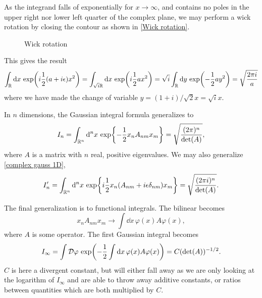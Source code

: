 As the integrand falls of exponentially for $x\rightarrow \infty$, and contains no poles in the upper right nor lower left quarter of the complex plane, we may perform a wick rotation by closing the contour as shown in \autoref{Wick rotation}.
\begin{figure}
    \centering
    \caption{Wick rotation}
    \label{Wick rotation}
\end{figure}
This gives the result
\begin{equation}
    \label{complex gauss 1D}
    \int_{\mathbb{R}} \dd x \, \exp(i \frac{1}{2}(a + i\epsilon) x^2) 
    = \int_{\sqrt{i}\mathbb{R}} \dd x \, \exp(i\frac{1}{2} ax^2)
    = \sqrt{i} \int_{\mathbb{R}} \dd y\, \exp(-\frac{1}{2} a y^2) = \sqrt{\frac{2 \pi i}{a}}
\end{equation}
where we have made the change of variable $y = (1+i)/\sqrt{2} x = \sqrt{i} x$.

In $n$ dimensions, the Gaussian integral formula generalizes to
\begin{equation}
    I_n = \int_{\mathbb{R}^n} \dd^n x \, \exp{-\frac{1}{2} x_n A_{nm} x_m } =\sqrt{\frac{(2 \pi)^n}{\det(A)}},
\end{equation}
where $A$ is a matrix with $n$ real, positive eigenvalues.
We may also generalize \autoref{complex gauss 1D},
\begin{equation}
    I'_n = 
    \int_{\mathbb{R}^n} \dd^n x \, \exp{i\frac{1}{2} x_n( A_{nm} + i \epsilon \delta_{nm}) x_m } =\sqrt{\frac{(2 \pi i )^n}{\det(A)}}.
\end{equation}

The final generalization is to functional integrals.
The bilinear becomes
\begin{equation}
    x_n A_{nm} x_m \rightarrow \int \dd x \, \varphi(x) A \varphi(x),
\end{equation}
where $A$ is some operator.
The first Gaussian integral becomes
\begin{equation}
    I_\infty = \int \mathcal{D} \varphi \, \exp(- \frac{1}{2} \int \dd x \, \varphi(x) A \varphi(x) )
    = C (\det(A))^{-1/2}.
\end{equation}
$C$ is here a divergent constant, but will either fall away as we are only looking at the logarithm of $I_\infty$ and are able to throw away additive constants, or ratios between quantities which are both multiplied by $C$.


